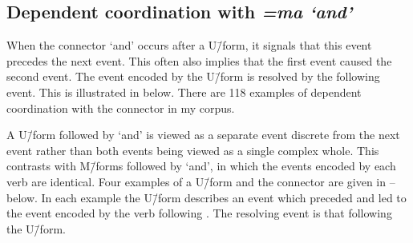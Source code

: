 \subsection{Dependent coordination with \it{=ma} `and'}\label{sec:Coo=Ma}
When the connector  `and' occurs after a U\=/form,
it signals that this event precedes the next event.
This often also implies that the first event caused the second event.
The event encoded by the U\=/form is resolved by the following event.
This is illustrated in  below.
There are 118 examples of dependent coordination
with the connector  in my corpus.

\begin{exe}\let\eachwordone=\textnormal
	\label{ex:=ma}
\end{exe}

A U\=/form followed by  `and'
is viewed as a separate event discrete from the next event
rather than both events being viewed as a single complex whole.
This contrasts with M\=/forms followed by  `and',
in which the events encoded by each verb are identical.
Four examples of a U\=/form and the connector 
are given in -- below.
In each example the U\=/form describes an event which
preceded and led to the event encoded by the verb following .
The resolving event is that following the U\=/form.

